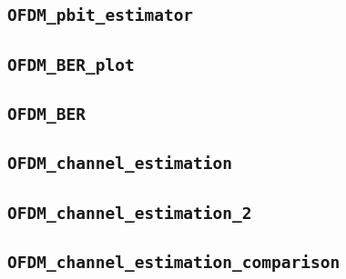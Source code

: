 \documentclass[10pt]{article}
\numberwithin{equation}{section}
\begin{document}
\subsection*{\texttt{OFDM\_pbit\_estimator}}


\pagebreak

\subsection*{\texttt{OFDM\_BER\_plot}}


\subsection*{\texttt{OFDM\_BER}}


\subsection*{\texttt{OFDM\_channel\_estimation}}


\pagebreak

\subsection*{\texttt{OFDM\_channel\_estimation\_2}}


\pagebreak

\subsection*{\texttt{OFDM\_channel\_estimation\_comparison}}

\end{document}
